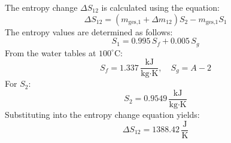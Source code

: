 The entropy change \( \Delta S_{12} \) is calculated using the equation:  
\[
\Delta S_{12} = (m_{\text{ges,1}} + \Delta m_{12}) S_2 - m_{\text{ges,1}} S_1
\]  
The entropy values are determined as follows:  
\[
S_1 = 0.995 \, S_f + 0.005 \, S_g
\]  
From the water tables at \( 100^\circ\text{C} \):  
\[
S_f = 1.337 \, \frac{\text{kJ}}{\text{kg·K}}, \quad S_g = A-2
\]  
For \( S_2 \):  
\[
S_2 = 0.9549 \, \frac{\text{kJ}}{\text{kg·K}}
\]  
Substituting into the entropy change equation yields:  
\[
\Delta S_{12} = 1388.42 \, \frac{\text{J}}{\text{K}}
\]